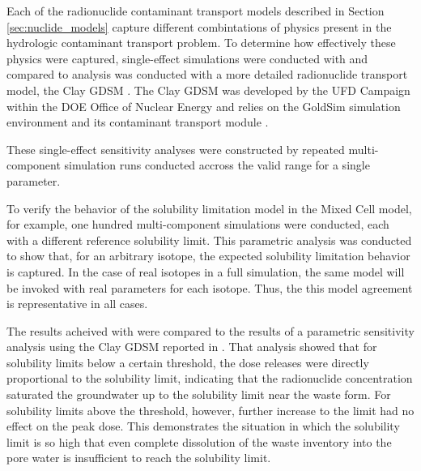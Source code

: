 Each of the radionuclide contaminant transport models described in Section
\ref{sec:nuclide_models} capture different combintations of physics present in
the hydrologic contaminant transport problem. To determine how effectively
these physics were captured, single-effect simulations were conducted with
\Cyder and compared to analysis was conducted with a more detailed radionuclide
transport model, the Clay \gls{GDSM} \cite{clayton_generic_2011}. The Clay
\gls{GDSM} was developed by the \gls{UFD} Campaign within the \gls{DOE} Office
of Nuclear Energy and relies on the GoldSim simulation environment
\cite{golder_associates_goldsim_2010} and its contaminant transport module
\cite{golder_associates_goldsim_2010-1}.

These single-effect sensitivity analyses were constructed by repeated
multi-component simulation runs conducted accross the valid range for a single
parameter.

To verify the behavior of the solubility limitation model in the Mixed Cell
model, for example, one hundred multi-component simulations were conducted,
each with a different reference solubility limit. This parametric analysis was
conducted to show that, for an arbitrary isotope, the expected solubility
limitation behavior is captured. In the case of real isotopes in a full
simulation, the same model will be invoked with real parameters for each
isotope. Thus, the this model agreement is representative in all cases.

The results acheived with \Cyder were compared to the results of a parametric
sensitivity analysis using the Clay \gls{GDSM} reported in
\cite{huff_key_2012}. That analysis showed that for solubility limits below a
certain threshold, the dose releases were directly proportional to the
solubility limit, indicating that the radionuclide concentration saturated the
groundwater up to the solubility limit near the waste form.  For solubility
limits above the threshold, however, further increase to the limit had no
effect on the peak dose. This demonstrates the situation in which the
solubility limit is so high that even complete dissolution of the waste
inventory into the pore water is insufficient to reach the solubility limit.

